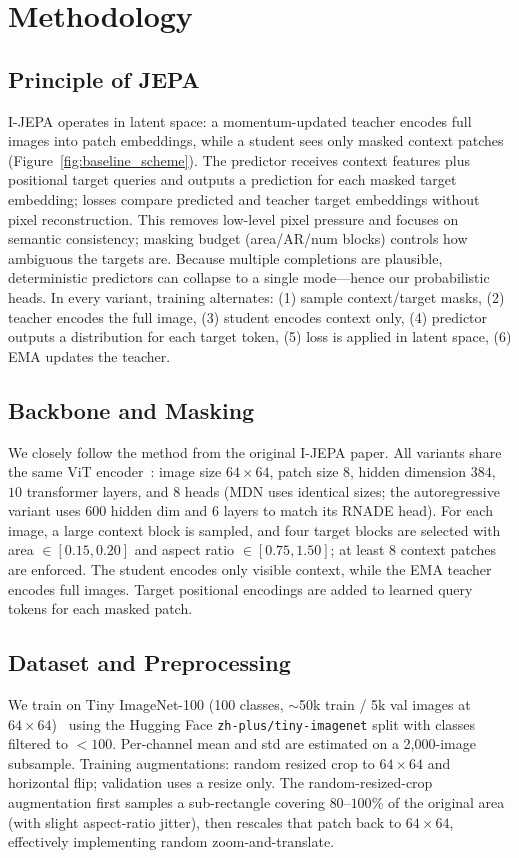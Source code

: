 \documentclass[conference]{IEEEtran}
\begin{document}
\section{Methodology}
\subsection{Principle of JEPA}
I-JEPA operates in latent space: a momentum-updated teacher encodes full images into patch embeddings, while a student sees only masked context patches (Figure~\ref{fig:baseline_scheme}).
The predictor receives context features plus positional target queries and outputs a prediction for each masked target embedding; losses compare predicted and teacher target embeddings without pixel reconstruction.
This removes low-level pixel pressure and focuses on semantic consistency; masking budget (area/AR/num blocks) controls how ambiguous the targets are.
Because multiple completions are plausible, deterministic predictors can collapse to a single mode—hence our probabilistic heads.
In every variant, training alternates: (1) sample context/target masks, (2) teacher encodes the full image, (3) student encodes context only, (4) predictor outputs a distribution for each target token, (5) loss is applied in latent space, (6) EMA updates the teacher.

\subsection{Backbone and Masking}
We closely follow the method from the original I-JEPA paper. All variants share the same ViT encoder~\cite{dosovitskiy2021vit}: image size $64{\times}64$, patch size $8$, hidden dimension $384$, $10$ transformer layers, and $8$ heads (MDN uses identical sizes; the autoregressive variant uses $600$ hidden dim and $6$ layers to match its RNADE head).
For each image, a large context block is sampled, and four target blocks are selected with area $\in[0.15,0.20]$ and aspect ratio $\in[0.75,1.50]$; at least $8$ context patches are enforced.
The student encodes only visible context, while the EMA teacher encodes full images.
Target positional encodings are added to learned query tokens for each masked patch.

\subsection{Dataset and Preprocessing}
We train on Tiny ImageNet-100 (100 classes, $\sim$50k train / 5k val images at $64{\times}64$)~\cite{le2015tinyimagenet} using the Hugging Face \texttt{zh-plus/tiny-imagenet} split with classes filtered to $<100$.
Per-channel mean and std are estimated on a 2{,}000-image subsample.
Training augmentations: random resized crop to $64{\times}64$ and horizontal flip; validation uses a resize only.
The random-resized-crop augmentation first samples a sub-rectangle covering $80$--$100\%$ of the original area (with slight aspect-ratio jitter), then rescales that patch back to $64{\times}64$, effectively implementing random zoom-and-translate.
\end{document}
